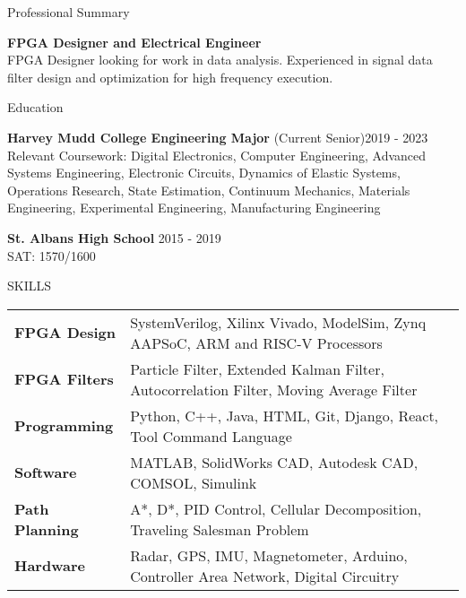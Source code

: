 \documentclass{resume} %
\begin{document}

\begin{rSection}{Professional Summary}

{\bf FPGA Designer and Electrical Engineer} \\
FPGA Designer looking for work in data analysis. Experienced in signal data filter design and optimization for high frequency execution.

\end{rSection}


\begin{rSection}{Education}

{\bf Harvey Mudd College Engineering Major} (Current Senior)\hfill {2019 - 2023}
\\
Relevant Coursework: Digital Electronics, Computer Engineering, Advanced Systems Engineering, Electronic Circuits, Dynamics of Elastic Systems, Operations Research, State Estimation, Continuum Mechanics, Materials Engineering, Experimental Engineering, Manufacturing Engineering 

{\bf St. Albans High School} \hfill {2015 - 2019}
\\
SAT: 1570/1600
\end{rSection} 

\begin{rSection}{SKILLS}

\begin{tabular}{ @{} >{\bfseries}l @{\hspace{6ex}} l }
FPGA Design & SystemVerilog, Xilinx Vivado, ModelSim, Zynq AAPSoC, ARM and RISC-V Processors  \\
FPGA Filters & Particle Filter, Extended Kalman Filter, Autocorrelation Filter, Moving Average Filter \\
Programming & Python, C++, Java, HTML, Git, Django, React, Tool Command Language  \\
Software & MATLAB, SolidWorks CAD, Autodesk CAD, COMSOL, Simulink \\
Path Planning & A*, D*, PID Control, Cellular Decomposition, Traveling Salesman Problem \\
Hardware & Radar, GPS, IMU, Magnetometer, Arduino, Controller Area Network, Digital Circuitry \\
 
\end{tabular}   

\end{rSection}
\end{document}
